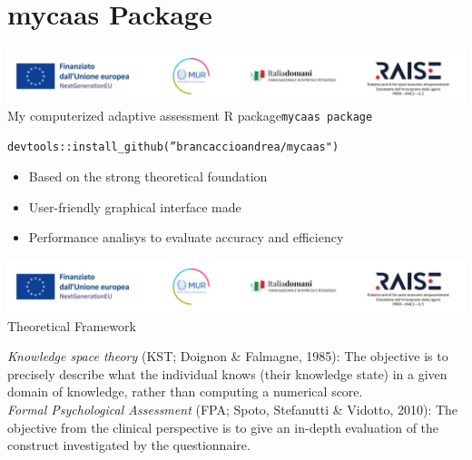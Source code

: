 \documentclass{beamer}
\begin{document}
\section{mycaas Package}

\begin{frame}{\includegraphics[scale=0.4]{Da_cambiare.png} \\ 
My computerized adaptive assessment R package}{\texttt{mycaas package}}
\begin{scriptsize}
\texttt{devtools::install\_github(''brancaccioandrea/mycaas")}
\end{scriptsize}
\vspace{1cm}
\begin{itemize}
\item Based on the strong theoretical foundation
\vspace{.2cm}
\item User-friendly graphical interface made
\vspace{.2cm}
\item  Performance analisys to evaluate accuracy and efficiency
\end{itemize}
\end{frame}

\begin{frame}{\includegraphics[scale=0.4]{Da_cambiare.png} \\ 
Theoretical Framework}

\emph{Knowledge space theory} (KST; Doignon \& Falmagne, 1985): The objective is to precisely describe what the individual knows (their knowledge state) in a given domain of knowledge, rather
than computing a numerical score.\\
 \vspace{1 cm}
\emph{Formal Psychological Assessment} (FPA; Spoto, Stefanutti \& Vidotto, 2010): The objective from the clinical
perspective is to give an in-depth evaluation of the construct investigated by the questionnaire. 

\end{frame}
\end{document}
